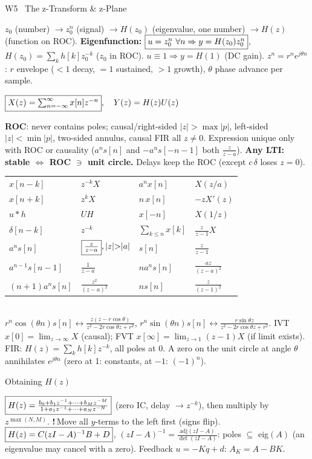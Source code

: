 \documentclass[a4paper,landscape]{article}
\newcommand{\sect}[1]{\par\vspace{1pt}\noindent\colorbox{secblue}{\parbox{\dimexpr\linewidth-2\fboxsep}{\color{white}\bfseries\fontsize{6.8}{7.6}\selectfont\strut #1}}\par\vspace{0.4pt}}
\newcommand{\sub}[1]{\par\vspace{0.6pt}\noindent\colorbox{subblue}{\parbox{\dimexpr\linewidth-2\fboxsep}{\bfseries\strut #1}}\par\vspace{0.2pt}}
\newcommand{\warn}[1]{{\color{warnred}\textbf{!}\,#1}}
\newcommand{\bx}[1]{\fbox{$\textstyle #1$}}
\newcommand{\eqc}[1]{\par\vspace{0.2pt}\centerline{$#1$}\par\vspace{0.2pt}}
\begin{document}
\begin{multicols*}{4}
\sect{W5 \ The z-Transform \& z-Plane}
$z_0$ (number) $\to z_0^n$ (signal) $\to H(z_0)$ (eigenvalue, one number) $\to H(z)$ (function on ROC). \textbf{Eigenfunction:} $\bx{u=z_0^n\ \forall n\Rightarrow y=H(z_0)z_0^n}$, $H(z_0)=\sum_kh[k]z_0^{-k}$ ($z_0$ in ROC). $u\equiv1\Rightarrow y=H(1)$ (DC gain).
$z^n=r^ne^{j\theta n}$: $r$ envelope ($<1$ decay, $=1$ sustained, $>1$ growth), $\theta$ phase advance per sample.
\eqc{\bx{X(z)=\textstyle\sum_{n=-\infty}^{\infty}x[n]z^{-n}},\quad Y(z)=H(z)U(z)}
\textbf{ROC}: never contains poles; causal/right-sided $|z|{>}\max|p|$, left-sided $|z|{<}\min|p|$, two-sided annulus, causal FIR all $z{\ne}0$. Expression unique only with ROC or causality ($a^ns[n]$ and $-a^ns[-n{-}1]$ both $\frac z{z-a}$). \textbf{Any LTI: stable $\iff$ ROC $\ni$ unit circle.} Delays keep the ROC (except $c\,\delta$ loses $z{=}0$).\\
\begin{tabular}{@{}ll|ll@{}}
$x[n{-}k]$ & $z^{-k}X$ & $a^nx[n]$ & $X(z/a)$\\
$x[n{+}k]$ & $z^kX$ & $n\,x[n]$ & $-zX'(z)$\\
$u*h$ & $UH$ & $x[-n]$ & $X(1/z)$\\
$\delta[n{-}k]$ & $z^{-k}$ & $\sum_{k\le n}x[k]$ & $\frac z{z-1}X$\\
$a^ns[n]$ & $\bx{\frac z{z-a}},|z|{>}|a|$ & $s[n]$ & $\frac z{z-1}$\\
$a^{n-1}s[n{-}1]$ & $\frac1{z-a}$ & $na^ns[n]$ & $\frac{az}{(z-a)^2}$\\
$(n{+}1)a^ns[n]$ & $\frac{z^2}{(z-a)^2}$ & $ns[n]$ & $\frac{z}{(z-1)^2}$
\end{tabular}\\
$r^n\cos(\theta n)s[n]\leftrightarrow\frac{z(z-r\cos\theta)}{z^2-2r\cos\theta z+r^2}$, $r^n\sin(\theta n)s[n]\leftrightarrow\frac{r\sin\theta z}{z^2-2r\cos\theta z+r^2}$. IVT $x[0]{=}\lim_{z\to\infty}X$ (causal); FVT $x[\infty]{=}\lim_{z\to1}(z{-}1)X$ (if limit exists).
FIR: $H(z)=\sum_kh[k]z^{-k}$, all poles at $0$. A zero on the unit circle at angle $\theta$ annihilates $e^{j\theta n}$ (zero at 1: constants, at $-1$: $(-1)^n$).
\sub{Obtaining $H(z)$}
$\bx{H(z)=\frac{b_0+b_1z^{-1}+\dots+b_Mz^{-M}}{1+a_1z^{-1}+\dots+a_Nz^{-N}}}$ (zero IC, delay $\to z^{-k}$), then multiply by $z^{\max(N,M)}$. \warn{Move all $y$-terms to the left first (signs flip).}
$\bx{H(z)=C(zI-A)^{-1}B+D}$, $(zI{-}A)^{-1}=\frac{\mathrm{adj}(zI-A)}{\det(zI-A)}$: poles $\subseteq$ eig$(A)$ (an eigenvalue may cancel with a zero). Feedback $u=-Kq+d$: $A_K=A-BK$.

\end{multicols*}
\end{document}
